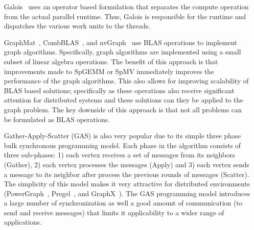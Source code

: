 Galois~\cite{pingali2011tao} uses an operator based formulation that separates the compute operation from the actual parallel runtime. Thus, Galois is responsible for the runtime and dispatches the various work units to the threads.



GraphMat~\cite{Sundaram:2015:GHP:2809974.2809983}, CombBLAS~\cite{Buluc:2011:CBD:2076556.2076566}, and nvGraph~\cite{nvGraph} use BLAS operations to implement graph algorithms. Specifically, graph algorithms are implemented using a small subset of linear algebra operations.
The benefit of this approach is that improvements made to SpGEMM or SpMV immediately improves the performance of the graph algorithms. This also allows for improving scalability of BLAS based solutions; specifically as these operations also receive significant attention for distributed systems and these solutions can they be applied to the graph problem.
The key downside of this approach is that not all problems can be formulated as BLAS operations.



Gather-Apply-Scatter (GAS) is also very popular due to its simple three phase bulk synchronous programming model. Each phase in the algorithm consists of three sub-phases: 1) each vertex receives a set of messages from its neighbors (Gather), 2) each vertex processes the messages (Apply) and 3) each vertex sends a message to its neighbor after process the previous rounds of messages (Scatter). The simplicity of this model makes it very attractive for distributed environments (PowerGraph~\cite{powergraph}, Pregel~\cite{pregel}, and GraphX~\cite{gonzalez2014graphx}). The GAS programming model introduces a large number of synchronization as well a good amount of communication (to send and receive messages) that limits it applicability to a wider range of applications.
